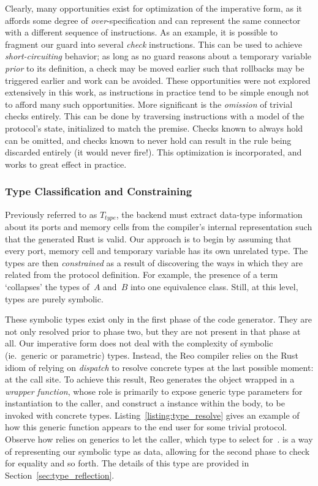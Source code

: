 Clearly, many opportunities exist for optimization of the imperative form, as it affords some degree of \textit{over}-specification and can represent the same connector with a different sequence of instructions. As an example, it is possible to fragment our guard into several \textit{check} instructions. This can be used to achieve \textit{short-circuiting} behavior; as long as no guard reasons about a temporary variable \textit{prior} to its definition, a check may be moved earlier such that rollbacks may be triggered earlier and work can be avoided. These opportunities were not explored extensively in this work, as instructions in practice tend to be simple enough not to afford many such opportunities.
More significant is the \textit{omission} of trivial checks entirely. This can be done by traversing instructions with a model of the protocol's state, initialized to match the premise. Checks known to always hold can be omitted, and checks known to never hold can result in the rule being discarded entirely (it would never fire!). This optimization is incorporated, and works to great effect in practice.


\subsubsection{Type Classification and Constraining}
Previously referred to as $T_{type}$, the backend must extract data-type information about its ports and memory cells from the compiler's internal representation such that the generated Rust is valid. Our approach is to begin by assuming that every port, memory cell and temporary variable has its own unrelated type. The types are then \textit{constrained} as a result of discovering the ways in which they are related from the protocol definition. For example, the presence of a term  `collapses' the types of~$A$ and~$B$ into one equivalence class. Still, at this level, types are purely symbolic. 

These symbolic types exist only in the first phase of the code generator. They are not only resolved prior to phase two, but they are not present in that phase at all. Our imperative form does not deal with the complexity of symbolic (ie.\ generic or parametric) types. Instead, the Reo compiler relies on the Rust idiom of relying on \textit{dispatch} to resolve concrete types at the last possible moment: at the call site. To achieve this result, Reo generates the  object wrapped in a \textit{wrapper function}, whose role is primarily to expose generic type parameters for instantiation to the caller, and construct a  instance within the body, to be invoked with concrete types. Listing~\ref{listing:type_resolve} gives an example of how this generic function appears to the end user for some trivial protocol. Observe how  relies on generics to let the caller,  which type to select for~.  is a way of representing our symbolic type as data, allowing for the second phase to check for equality and so forth. The details of this type are provided in Section~\ref{sec:type_reflection}.


